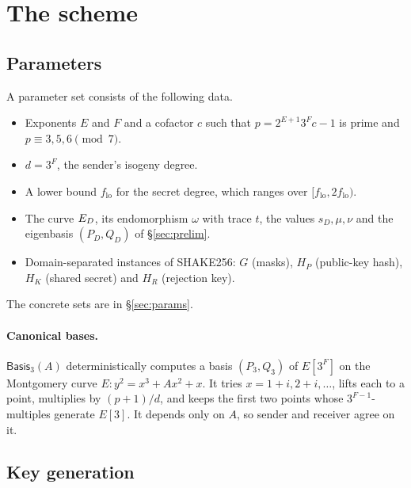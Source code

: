 \section{The scheme}\label{sec:scheme}

\subsection{Parameters}
A parameter set consists of the following data.
\begin{itemize}
\item Exponents $E$ and $F$ and a cofactor $c$ such that
  $p=2^{E+1}3^Fc-1$ is prime and $p\equiv3,5,6\pmod 7$.
\item $d=3^F$, the sender's isogeny degree.
\item A lower bound $f_{\mathrm{lo}}$ for the secret degree, which ranges over
  $[f_{\mathrm{lo}},2f_{\mathrm{lo}})$.
\item The curve $E_D$, its endomorphism $\omega$ with trace $t$, the values
  $s_D,\mu,\nu$ and the eigenbasis $(P_D,Q_D)$ of \S\ref{sec:prelim}.
\item Domain-separated instances of SHAKE256: $G$ (masks), $H_P$ (public-key
  hash), $H_K$ (shared secret) and $H_R$ (rejection key).
\end{itemize}
The concrete sets are in \S\ref{sec:params}.

\paragraph{Canonical bases.} $\textsf{Basis}_3(A)$ deterministically
computes a basis $(P_3,Q_3)$ of $E[3^F]$ on the Montgomery curve
$E:y^2=x^3+Ax^2+x$. It tries $x=1+i,2+i,\dots$, lifts each to a point,
multiplies by $(p+1)/d$, and keeps the first two points whose
$3^{F-1}$-multiples generate $E[3]$. It depends only on $A$, so sender and
receiver agree on it.

\subsection{Key generation}

